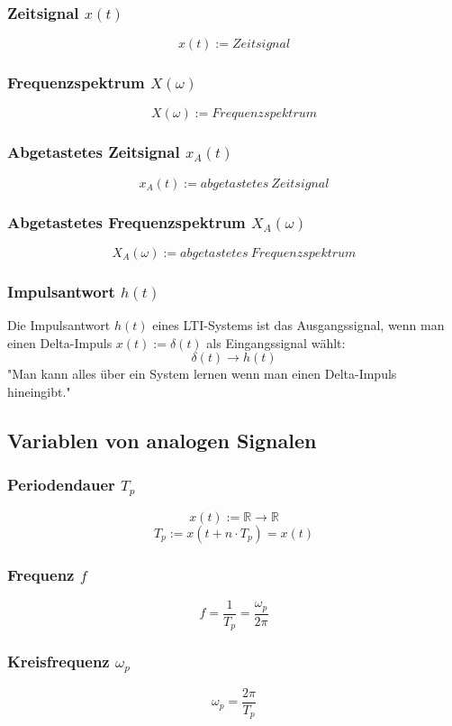 \documentclass[12pt,a4paper]{scrartcl}
\begin{document}
\subsubsection{Zeitsignal $x(t)$}
\label{sec:sub:sub:zeitsignal}
$$x(t) := Zeitsignal$$
\subsubsection{Frequenzspektrum $X(\omega)$}
\label{sec:sub:sub:frequenzspektrum}
$$X(\omega) := Frequenzspektrum $$
\subsubsection{Abgetastetes Zeitsignal $x_A(t)$}
\label{sec:sub:sub:abgetastetes-zeitsignal}
$$x_A(t) := abgetastetes\ Zeitsignal$$
\subsubsection{Abgetastetes Frequenzspektrum $X_A(\omega)$}
\label{sec:sub:sub:abgetastetes-frequenzspektrum}
$$X_A(\omega) := abgetastetes\ Frequenzspektrum $$
\subsubsection{Impulsantwort $h(t)$}
\label{sec:sub:impulsantwort}
Die Impulsantwort $h(t)$ eines LTI-Systems ist das Ausgangssignal, wenn man einen Delta-Impuls $x(t) := \delta(t)$ als Eingangssignal wählt:
$$ \delta(t) \to h(t)$$
"Man kann alles über ein System lernen wenn man einen Delta-Impuls hineingibt."

\subsection{Variablen von analogen Signalen}
\label{sec:sub:const-def-analoge-signale}
\subsubsection{Periodendauer $T_p$}
\label{sec:sub:sub:periodendauer}
$$ x(t) := \mathbb{R} \to \mathbb{R}$$
$$T_p := x(t + n \cdot T_p) = x(t)$$
\subsubsection{Frequenz $f$}
\label{sec:sub:sub:frequenz}
$$f = \frac{1}{T_p} = \frac{\omega_p}{2\pi}$$
\subsubsection{Kreisfrequenz $\omega_p$}
\label{sec:sub:sub:periodendauer-im-spektrum-kreisfrequenz}
$$\omega_p = \frac{2\pi}{T_p}$$
\end{document}
